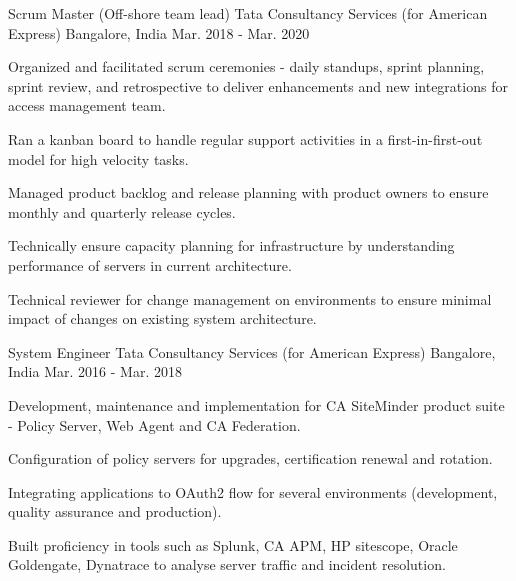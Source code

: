 

\begin{cventries}

  \cventry
    {Scrum Master (Off-shore team lead)} %
    {Tata Consultancy Services (for American Express)} %
    {Bangalore, India} %
    {Mar. 2018 - Mar. 2020} %
    {
      \begin{cvitems} %
        \item {Organized and facilitated scrum ceremonies - daily standups, sprint planning, sprint review, and retrospective to deliver enhancements and new integrations for access management team.}
        \item {Ran a kanban board to handle regular support activities in a first-in-first-out model for high velocity tasks.}
        \item {Managed product backlog and release planning with product owners to ensure monthly and quarterly release cycles.}
        \item {Technically ensure capacity planning for infrastructure by understanding performance of servers in current architecture.}
        \item {Technical reviewer for change management on environments to ensure minimal impact of changes on existing system architecture.}
      \end{cvitems}
    }

  \cventry
    {System Engineer} %
    {Tata Consultancy Services (for American Express)} %
    {Bangalore, India} %
    {Mar. 2016 - Mar. 2018} %
    {
      \begin{cvitems} %
        \item {Development, maintenance and implementation for CA SiteMinder product suite - Policy Server, Web Agent and CA Federation.}
        \item {Configuration of policy servers for upgrades, certification renewal and rotation.}
        \item {Integrating applications to OAuth2 flow for several environments (development, quality assurance and production).}
        \item {Built proficiency in tools such as Splunk, CA APM, HP sitescope, Oracle Goldengate, Dynatrace to analyse server traffic and incident resolution.}
      \end{cvitems}
    }

\end{cventries}
